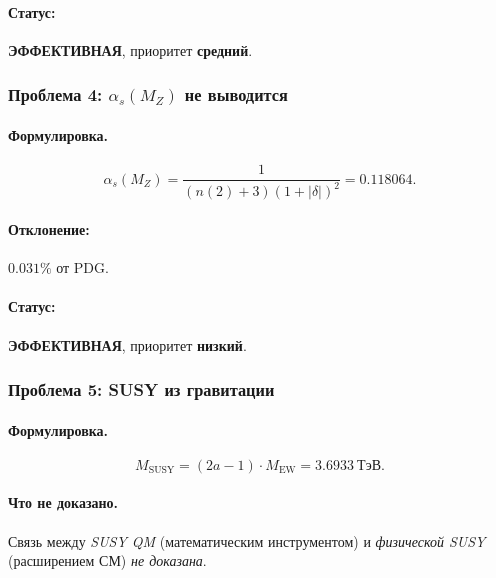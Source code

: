 \documentclass[11pt,a4paper]{article}
\newcommand{\MEW}{M_{\text{EW}}}
\newcommand{\MSUSY}{M_{\text{SUSY}}}
\theoremstyle{definition}
\begin{document}
\paragraph{Статус:} \textbf{ЭФФЕКТИВНАЯ}, приоритет \textbf{средний}.

\subsubsection{Проблема 4: $\alpha_s(M_Z)$ не выводится}

\paragraph{Формулировка.}
\begin{equation}
    \alpha_s(M_Z) = \frac{1}{(n(2) + 3)(1 + |\delta|)^2}
    = 0.118064.
\end{equation}

\paragraph{Отклонение:} $0.031\%$ от PDG.

\paragraph{Статус:} \textbf{ЭФФЕКТИВНАЯ}, приоритет \textbf{низкий}.

\subsubsection{Проблема 5: SUSY из гравитации}

\paragraph{Формулировка.}
\begin{equation}
    \MSUSY = (2a - 1) \cdot \MEW = 3.6933~\text{ТэВ}.
\end{equation}

\paragraph{Что не доказано.}
Связь между \emph{SUSY QM} (математическим инструментом) и 
\emph{физической SUSY} (расширением СМ) \emph{не доказана}.
\end{document}
